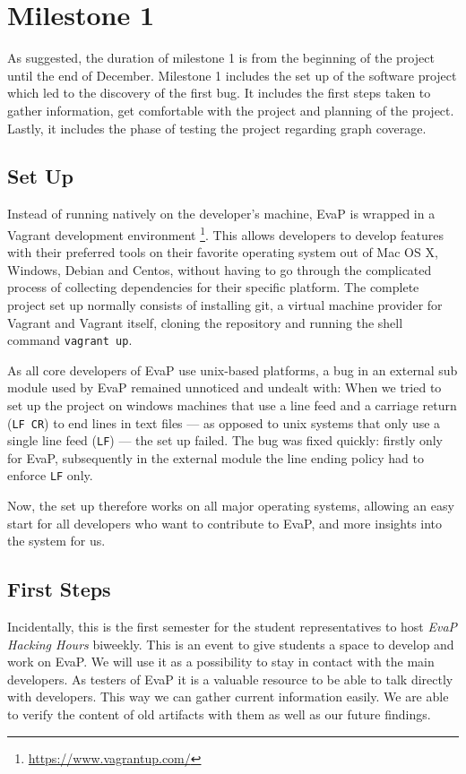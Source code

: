 \section{Milestone 1}
As suggested, the duration of milestone 1 is from the beginning of the project until the end of December.
Milestone 1 includes the set up of the software project which led to the discovery of the first bug.
It includes the first steps taken to gather information, get comfortable with the project and planning of the project.
Lastly, it includes the phase of testing the project regarding graph coverage.

\subsection{Set Up}
Instead of running natively on the developer's machine, EvaP is wrapped in a Vagrant development environment%
\footnote{\url{https://www.vagrantup.com/}}.
This allows developers to develop features with their preferred tools on their favorite operating system out of Mac OS X, Windows, Debian and Centos, without having to go through the complicated process of collecting dependencies for their specific platform.
The complete project set up normally consists of installing git, a virtual machine provider for Vagrant and Vagrant itself, cloning the repository and running the shell command \texttt{vagrant up}.

As all core developers of EvaP use unix-based platforms, a bug in an external sub module used by EvaP remained unnoticed and undealt with:
When we tried to set up the project on windows machines that use a line feed and a carriage return (\texttt{LF}~\texttt{CR}) to end lines in text files --- as opposed to unix systems that only use a single line feed (\texttt{LF}) --- the set up failed.
The bug was fixed quickly: firstly only for EvaP, subsequently in the external module the line ending policy had to enforce \texttt{LF} only.

Now, the set up therefore works on all major operating systems, allowing an easy start for all developers who want to contribute to EvaP, and more insights into the system for us.

\subsection{First Steps}
Incidentally, this is the first semester for the student representatives to host \emph{EvaP Hacking Hours} biweekly.
This is an event to give students a space to develop and work on EvaP.
We will use it as a possibility to stay in contact with the main developers.
As testers of EvaP it is a valuable resource to be able to talk directly with developers.
This way we can gather current information easily.
We are able to verify the content of old artifacts with them as well as our future findings.

